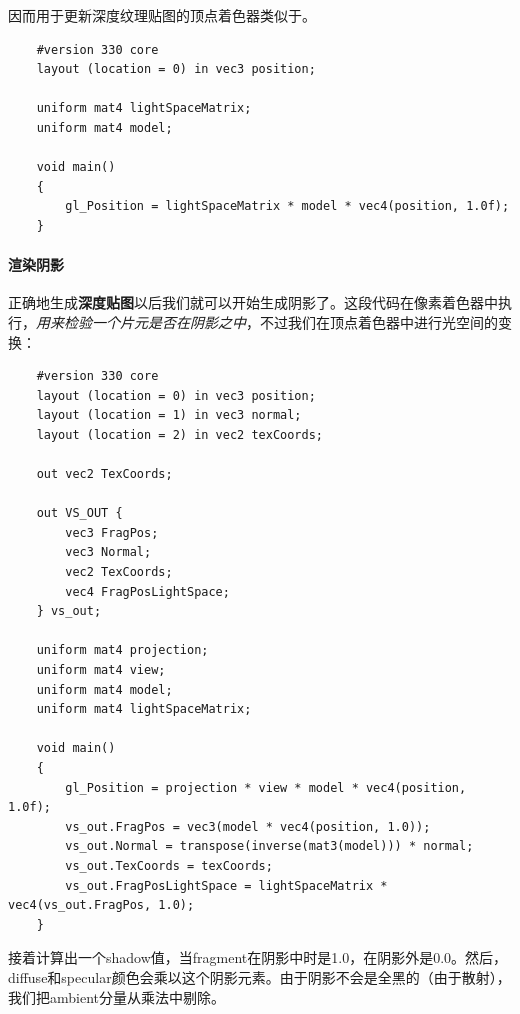 \documentclass[UTF8,a4paper,12pt]{ctexbook}
\begin{document}
				因而用于更新深度纹理贴图的顶点着色器类似于。
				\begin{lstlisting}
	#version 330 core
	layout (location = 0) in vec3 position;
	
	uniform mat4 lightSpaceMatrix;
	uniform mat4 model;
	
	void main()
	{
	    gl_Position = lightSpaceMatrix * model * vec4(position, 1.0f);
	}
				\end{lstlisting}
				

			\paragraph{渲染阴影}
				正确地生成\textbf{深度贴图}以后我们就可以开始生成阴影了。这段代码在像素着色器中执行，\textit{用来检验一个片元是否在阴影之中}，不过我们在顶点着色器中进行光空间的变换：
				
				\begin{lstlisting}
	#version 330 core
	layout (location = 0) in vec3 position;
	layout (location = 1) in vec3 normal;
	layout (location = 2) in vec2 texCoords;
	
	out vec2 TexCoords;
	
	out VS_OUT {
	    vec3 FragPos;
	    vec3 Normal;
	    vec2 TexCoords;
	    vec4 FragPosLightSpace;
	} vs_out;
	
	uniform mat4 projection;
	uniform mat4 view;
	uniform mat4 model;
	uniform mat4 lightSpaceMatrix;
	
	void main()
	{
	    gl_Position = projection * view * model * vec4(position, 1.0f);
	    vs_out.FragPos = vec3(model * vec4(position, 1.0));
	    vs_out.Normal = transpose(inverse(mat3(model))) * normal;
	    vs_out.TexCoords = texCoords;
	    vs_out.FragPosLightSpace = lightSpaceMatrix * vec4(vs_out.FragPos, 1.0);
	}				
				\end{lstlisting}
			
				接着计算出一个shadow值，当fragment在阴影中时是1.0，在阴影外是0.0。然后，diffuse和specular颜色会乘以这个阴影元素。由于阴影不会是全黑的（由于散射），我们把ambient分量从乘法中剔除。
				
\end{document}
